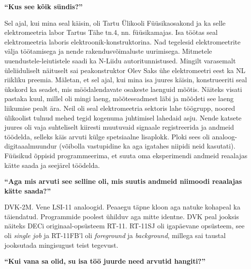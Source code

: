 \textbf{\enquote{Kus see kõik sündis?}}

Sel ajal, kui mina seal käisin, oli Tartu Ülikooli
Füüsikaosakond ja ka selle elektromeetria labor
Tartus Tähe tn.4, nn. füüsikamajas. Isa töötas seal elektromeetria laboris
elektroonik-konstruktorina. Nad tegelesid elektromeetrite välja töötamisega ja
nende rakendusvõimaluste uurimisega. Mitmetele uuendustele-leiutistele saadi ka
N-Liidu autoritunnistused. Mingilt varasemalt üleliiduliselt näituselt sai
peakonstruktor Olev Saks ühe elektromeetri eest ka NL riikliku preemia.
Mäletan, et sel ajal, kui mina isa juures käisin, konstrueeriti seal ükskord ka
seadet, mis möödalendavate osakeste laenguid mõõtis. Näiteks visati pastaka
kuul, millel oli mingi laeng, mõõteseadmest läbi ja mõõdeti see laeng liikumise
pealt ära. Neil oli seal elektromeetria sektoris lahe töögrupp, noored
ülikoolist tulnud mehed tegid kogenuma juhtimisel lahedaid asju. Nende katsete
juures oli vaja suhteliselt kiiresti muutuvaid signaale registreerida ja
andmeid töödelda, selleks käis arvuti külge spetsiaalne lisaplokk. Ploki sees
oli analoog-digitaaalmuundur (võibolla vastupidine ka aga igatahes niipidi neid
kasutati). Füüsikud õppisid programmeerima, et suuta oma eksperimendi andmeid
reaalajas kätte saada ja seejärel töödelda.

\textbf{\enquote{Aga mis arvuti see selline oli, mis suutis andmeid niimoodi
reaalajas kätte saada?}}

DVK-2M. Vene LSI-11
analoogid. Peaaegu täpne kloon aga natuke kohapeal ka täiendatud. Programmide
poolest ühilduv aga mitte identne. DVK peal jooksis näiteks DECi
originaal-opsüsteem RT-11. RT-11SJ oli igapäevane opsüsteem, see
oli \emph{single job} ja RT-11FB'l oli \emph{foreground} ja \emph{background},
millega sai taustal jooksutada mingisugust teist tegevust.

\textbf{\enquote{Kui vana sa olid, su isa töö juurde need arvutid hangiti?}}

